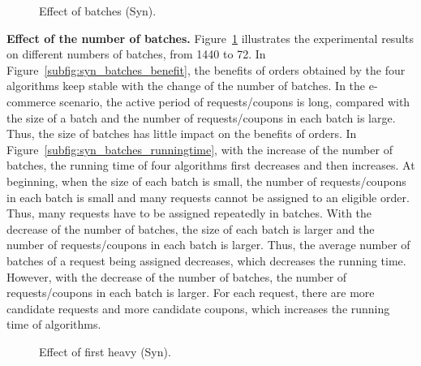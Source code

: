 \begin{figure}[t!]\centering
	\subfigcapskip=-5pt
		\vspace{1ex}
	\vspace{-2ex}
	\addtocounter{subfigure}{-1}
	\figureCaptionMargin
	\vspace{1ex}
	\caption{\small Effect of batches (Syn).}\figureBelowMargin
	\label{fig:syn_batches}
\end{figure}
\textbf{Effect of the number of batches.} Figure~\ref{fig:syn_batches} illustrates the experimental results on different numbers of batches, from 1440 to 72. In Figure~\ref{subfig:syn_batches_benefit}, the benefits of orders obtained by the four algorithms keep stable with the change of the number of batches. In the e-commerce scenario, the active period of requests/coupons is long, compared with the size of a batch and the number of requests/coupons in each batch is large. Thus, the size of batches has little impact on the benefits of orders. In Figure~\ref{subfig:syn_batches_runningtime}, with the increase of the number of batches, the running time of four algorithms first decreases and then increases. At beginning, when the size of each batch is small, the number of requests/coupons in each batch is small and many requests cannot be assigned to an eligible order. Thus, many requests have to be assigned repeatedly in batches. With the decrease of the number of batches, the size of each batch is larger and the number of requests/coupons in each batch is larger. Thus, the average number of batches of a request being assigned decreases, which decreases the running time. However, with the decrease of the number of batches, the number of requests/coupons in each batch is larger. For each request, there are more candidate requests and more candidate coupons, which increases the running time of algorithms. 
\begin{figure}[t!]\centering
	\subfigcapskip=-5pt
	\vspace{-2ex}
	\addtocounter{subfigure}{-1}
	\figureCaptionMargin
	\vspace{1ex}
	\caption{\small Effect of first heavy (Syn).}\figureBelowMargin
	\label{fig:syn_first}
\end{figure}

